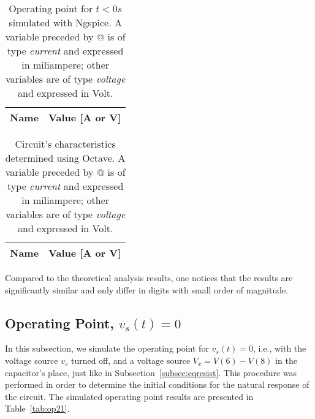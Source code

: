 \noindent
\begin{minipage}[c]{0.5\linewidth}

\begin{table}[H]
  \centering
  \begin{tabular}{|l|r|}
    \hline    
    {\bf Name} & {\bf Value [A or V]} \\ \hline
    
  \end{tabular}
  \caption{Operating point for $t<0s$ simulated with Ngspice. A variable preceded by @ is of type {\em current}
    and expressed in miliampere; other variables are of type {\it voltage} and expressed in
    Volt.}
  \label{tab:op11}
\end{table}

\end{minipage}
\begin{minipage}[c]{0.5\linewidth}

\vspace{9.4mm}

\begin{table}[H]
  \centering
  \begin{tabular}{|l|r|}
    \hline    
    {\bf Name} & {\bf Value [A or V]} \\ \hline
    
  \end{tabular}
  \caption{Circuit's characteristics determined using Octave. A variable preceded by @ is of type {\em current}
    and expressed in miliampere; other variables are of type {\it voltage} and expressed in
    Volt.}
  \label{tab:op12}
\end{table}

\end{minipage}

\vspace{3mm}

Compared to the theoretical analysis results, one notices that the results are significantly similar and only differ in digits with small order of magnitude.

\subsection{Operating Point, $v_s(t)=0$} \label{subsec:op2}

In this subsection, we simulate the operating point for $v_s(t)=0$, i.e., with the voltage source $v_s$ turned off, and a voltage source $V_x=V(6)-V(8)$ in the capacitor's place, just like in Subsection~\ref{subsec:eqresist}. This procedure was performed in order to determine the initial conditions for the natural response of the circuit. The simulated operating point results are presented in Table~\ref{tab:op21}.

